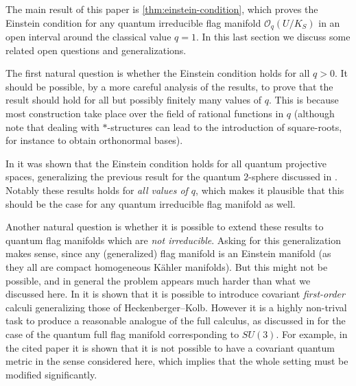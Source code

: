 \documentclass[a4paper,12pt,reqno,english]{amsart}
\numberwithin{equation}{section}
\numberwithin{figure}{section}
\theoremstyle{plain}
\theoremstyle{plain}
\theoremstyle{plain}
\theoremstyle{plain}
\theoremstyle{plain}
\theoremstyle{definition}
\theoremstyle{definition}
\theoremstyle{definition}
\theoremstyle{remark}
\theoremstyle{definition}
\newcommand{\Oqflag}{\mathcal{O}_q(U / K_S)}
\begin{document}
The main result of this paper is \cref{thm:einstein-condition}, which proves the Einstein condition for any quantum irreducible flag manifold $\Oqflag$ in an open interval around the classical value $q = 1$.
In this last section we discuss some related open questions and generalizations.

The first natural question is whether the Einstein condition holds for all $q > 0$. It should be possible, by a more careful analysis of the results, to prove that the result should hold for all but possibly finitely many values of $q$.
This is because most construction take place over the field of rational functions in $q$ (although note that dealing with $*$-structures can lead to the introduction of square-roots, for instance to obtain orthonormal bases).

In \cite[Theorem 6.5]{matassa-riemannian} it was shown that the Einstein condition holds for all quantum projective spaces, generalizing the previous result for the quantum $2$-sphere discussed in \cite[Section 8.2.3]{quantum-book}.
Notably these results holds for \emph{all values of $q$}, which makes it plausible that this should be the case for any quantum irreducible flag manifold as well.

Another natural question is whether it is possible to extend these results to quantum flag manifolds which are \emph{not irreducible}.
Asking for this generalization makes sense, since any (generalized) flag manifold is an Einstein manifold (as they all are compact homogeneous Kähler manifolds).
But this might not be possible, and in general the problem appears much harder than what we discussed here.
In \cite{equivariant} it is shown that it is possible to introduce covariant \emph{first-order} calculi generalizing those of Heckenberger--Kolb.
However it is a highly non-trival task to produce a reasonable analogue of the full calculus, as discussed in \cite{full-flag} for the case of the quantum full flag manifold corresponding to $SU(3)$.
For example, in the cited paper it is shown that it is not possible to have a covariant quantum metric in the sense considered here, which implies that the whole setting must be modified significantly.
\end{document}
